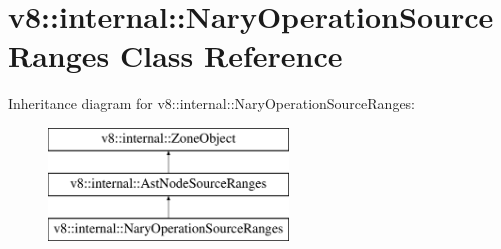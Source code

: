 \hypertarget{classv8_1_1internal_1_1NaryOperationSourceRanges}{}\section{v8\+:\+:internal\+:\+:Nary\+Operation\+Source\+Ranges Class Reference}
\label{classv8_1_1internal_1_1NaryOperationSourceRanges}
Inheritance diagram for v8\+:\+:internal\+:\+:Nary\+Operation\+Source\+Ranges\+:\begin{figure}[H]
\begin{center}
\leavevmode
\includegraphics[height=3.000000cm]{classv8_1_1internal_1_1NaryOperationSourceRanges}
\end{center}
\end{figure}
